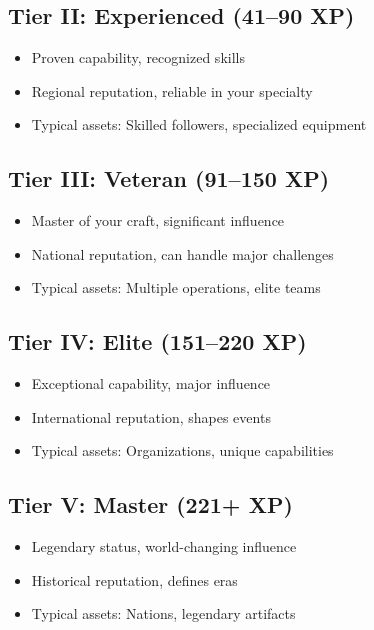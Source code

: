 \documentclass[11pt,twoside,openany]{book}
\begin{document}
\subsection*{Tier II: Experienced (41–90 XP)}

\begin{itemize}
\item Proven capability, recognized skills
\item Regional reputation, reliable in your specialty
\item Typical assets: Skilled followers, specialized equipment
\end{itemize}

\subsection*{Tier III: Veteran (91–150 XP)}

\begin{itemize}
\item Master of your craft, significant influence
\item National reputation, can handle major challenges
\item Typical assets: Multiple operations, elite teams
\end{itemize}

\subsection*{Tier IV: Elite (151–220 XP)}

\begin{itemize}
\item Exceptional capability, major influence
\item International reputation, shapes events
\item Typical assets: Organizations, unique capabilities
\end{itemize}

\subsection*{Tier V: Master (221+ XP)}

\begin{itemize}
\item Legendary status, world-changing influence
\item Historical reputation, defines eras
\item Typical assets: Nations, legendary artifacts
\end{itemize}
\end{document}

